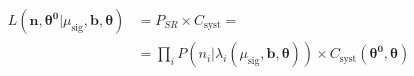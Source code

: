 \documentclass[5pt,a4paper]{article}
\begin{document}
{\huge


\pagebreak 

\pagebreak 

\pagebreak 

\pagebreak 


\begin{equation}
\begin{split}
L(\boldsymbol{n},\boldsymbol{\theta^0}|\mu_\text{sig},\boldsymbol{b},\boldsymbol{\theta}) & = P_{SR} \times C_\text{syst} = \\
& = \prod_{i} P(n_i|\lambda_i(\mu_\text{sig},\boldsymbol{b},\boldsymbol{\theta})) \times C_\text{syst}(\boldsymbol{\theta^0},\boldsymbol{\theta})
\end{split}
\end{equation}


}
\end{document}

